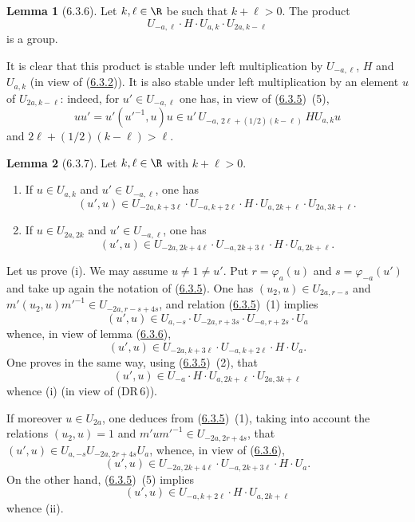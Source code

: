 \documentclass[12pt,a4paper,oneside,english]{smfart}
\makeatletter
\newcommand{\btanchor}[1]{\leavevmode\Hy@raisedlink{\hypertarget{bt:#1}{}}}
\newcommand{\btpageanchor}[1]{\Hy@raisedlink{\hypertarget{p:#1}{}}}
\newcommand{\btref}[1]{\hyperlink{bt:#1}{#1}}
\newcommand{\btpage}[1]{\marginnote{p.~#1}\btpageanchor{#1}}
\newcommand{\pmark}[1]{\btpage{#1}}
\theoremstyle{definition}
\theoremstyle{bt}
\newtheorem{lem}{Lemma}
\makeatother
\begin{document}
\begin{lem}[6.3.6]\btanchor{6.3.6}
Let $k,\ell\in\R$ be such that $k+\ell>0$. The product
\[
  U_{-a,\ell}\cdot H\cdot U_{a,k}\cdot U_{2a,k-\ell}
\]
is a group.
\end{lem}

It is clear that this product is stable under left multiplication by
$U_{-a,\ell}$, $H$ and $U_{a,k}$ (in view of (\btref{6.3.2})). It is also stable
under left multiplication by an element $u$ of $U_{2a,k-\ell}$: indeed, for
$u'\in U_{-a,\ell}$ one has, in view of (\btref{6.3.5})~(5),
\[
  uu'=u'(u'^{-1},u)u\in u'\,U_{-a,\,2\ell+(1/2)(k-\ell)}\,HU_{a,k}u
\]
and $2\ell+(1/2)(k-\ell)>\ell$.

\begin{lem}[6.3.7]\btanchor{6.3.7}
Let $k,\ell\in\R$ with $k+\ell>0$.
\begin{enumerate}[label=(\roman*),leftmargin=2.2em]
\item If $u\in U_{a,k}$ and $u'\in U_{-a,\ell}$, one has
\[
  (u',u)\in U_{-2a,k+3\ell}\cdot U_{-a,k+2\ell}\cdot H\cdot U_{a,2k+\ell}
          \cdot U_{2a,3k+\ell}.
\]
\item If $u\in U_{2a,2k}$ and $u'\in U_{-a,\ell}$, one has
\[
  (u',u)\in U_{-2a,2k+4\ell}\cdot U_{-a,2k+3\ell}\cdot H\cdot U_{a,2k+\ell}.
\]
\end{enumerate}
\end{lem}

Let us prove (i). We may assume $u\neq1\neq u'$. Put $r=\varphi_a(u)$ and
$s=\varphi_{-a}(u')$ and take up again the notation of (\btref{6.3.5}). One has
$(u_2,u)\in U_{2a,r-s}$ and $m'(u_2,u)m'^{-1}\in U_{-2a,r-s+4s}$, and
relation (\btref{6.3.5})~(1) implies
\[
  (u',u)\in U_{a,-s}\cdot U_{-2a,r+3s}\cdot U_{-a,r+2s}\cdot U_a
\]
\pmark{131}
whence, in view of lemma (\btref{6.3.6}),
\[
  (u',u)\in U_{-2a,k+3\ell}\cdot U_{-a,k+2\ell}\cdot H\cdot U_a .
\]
One proves in the same way, using (\btref{6.3.5})~(2), that
\[
  (u',u)\in U_{-a}\cdot H\cdot U_{a,2k+\ell}\cdot U_{2a,3k+\ell}
\]
whence (i) (in view of (DR\,6)).

If moreover $u\in U_{2a}$, one deduces from (\btref{6.3.5})~(1), taking into
account the relations $(u_2,u)=1$ and $m'um'^{-1}\in U_{-2a,2r+4s}$, that
$(u',u)\in U_{a,-s}U_{-2a,2r+4s}U_a$, whence, in view of (\btref{6.3.6}),
\[
  (u',u)\in U_{-2a,2k+4\ell}\cdot U_{-a,2k+3\ell}\cdot H\cdot U_a .
\]
On the other hand, (\btref{6.3.5})~(5) implies
\[
  (u',u)\in U_{-a,k+2\ell}\cdot H\cdot U_{a,2k+\ell}
\]
whence (ii).
\end{document}
